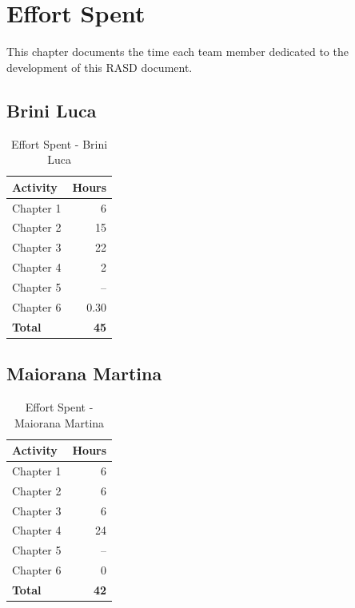 \chapter{Effort Spent}
\label{ch:effort}

This chapter documents the time each team member dedicated to the development of this RASD document.

\section{Brini Luca}
\begin{table}[H]
\centering
\begin{tabular}{|l|r|}
\hline
\textbf{Activity} & \textbf{Hours} \\ \hline
Chapter 1 & 6 \\ \hline
Chapter 2 & 15  \\ \hline
Chapter 3 & 22 \\ \hline
Chapter 4 & 2 \\ \hline
Chapter 5 & -- \\ \hline
Chapter 6 & 0.30 \\ \hline
\textbf{Total} & \textbf{45} \\ \hline
\end{tabular}
\caption{Effort Spent - Brini Luca}
\end{table}

\section{Maiorana Martina}
\begin{table}[H]
\centering
\begin{tabular}{|l|r|}
\hline
\textbf{Activity} & \textbf{Hours} \\ \hline
Chapter 1 & 6 \\ \hline
Chapter 2 & 6 \\ \hline
Chapter 3 & 6 \\ \hline
Chapter 4 & 24 \\ \hline
Chapter 5 & -- \\ \hline
Chapter 6 & 0 \\ \hline
\textbf{Total} & \textbf{42} \\ \hline
\end{tabular}
\caption{Effort Spent - Maiorana Martina}
\end{table}

